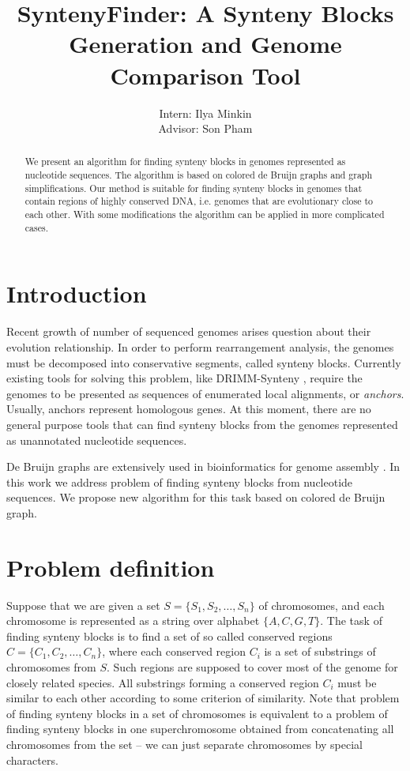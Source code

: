 \documentclass[a4paper,12pt]{scrartcl}
\begin{document}
\title{SyntenyFinder: A Synteny Blocks Generation and Genome Comparison Tool}
\author{Intern: Ilya Minkin\\
	Advisor: Son Pham}
\date{}
\maketitle

\begin{abstract}
We present an algorithm for finding synteny blocks in genomes represented as nucleotide sequences. The algorithm is based
on colored de Bruijn graphs and graph simplifications. Our method is suitable for finding synteny blocks in genomes that
contain regions of highly conserved DNA, i.e. genomes that are evolutionary close to each other. With some modifications
the algorithm can be applied in more complicated cases.

\end{abstract}

\section{Introduction}

Recent growth of number of sequenced genomes arises question about their evolution relationship. 
In order to perform rearrangement analysis, the genomes must be decomposed into conservative segments,
called synteny blocks. Currently existing tools for solving this problem, like DRIMM-Synteny
\cite{Pham2010}, require the genomes to be presented as sequences of enumerated local alignments, or \textit{anchors}.
Usually, anchors represent homologous genes. At this moment, there are no general purpose tools that can
find synteny blocks from the genomes represented as unannotated nucleotide sequences.

De Bruijn graphs are extensively used in bioinformatics for genome assembly \cite{Pevzner2001, Iqbal2012}. 
In this work we address problem of finding synteny blocks from nucleotide sequences. We propose new 
algorithm for this task based on colored de Bruijn graph.

\section{Problem definition}

Suppose that we are given a set \(S = \lbrace S_{1}, S_{2}, \ldots, S_{n} \rbrace \) of chromosomes, and each
chromosome is represented as a string over alphabet \(\lbrace A, C, G, T \rbrace \). The task of finding synteny
blocks is to find a set of so called conserved regions \(C = \lbrace C_{1}, C_{2}, \ldots , C_{n} \rbrace \), where
each conserved region \(C_{i}\) is a set of substrings of chromosomes from \(S\). Such regions are supposed 
to cover most of the genome for closely related species.  All substrings forming a conserved region \(C_{i}\) must be
similar to each other according to some criterion of similarity. Note that problem of finding synteny blocks in a set
of chromosomes is equivalent to a problem of finding synteny blocks in one superchromosome
obtained from concatenating all chromosomes from the set -- we can just separate chromosomes by special characters.
\end{document}
